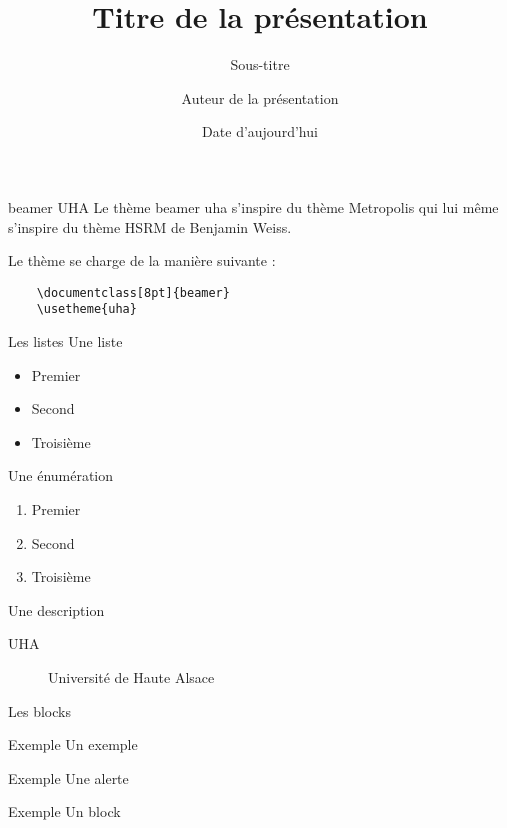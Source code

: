 \documentclass[9pt]{beamer}
\title{Titre de la présentation}
\subtitle{Sous-titre}
\date{Date d'aujourd'hui}
\author{Auteur de la présentation}
\institute{Université de Haute Alsace}
\begin{document}
\begin{frame}
	\titlepage
\end{frame}

\begin{frame}[fragile]{beamer UHA}
	Le thème beamer uha s'inspire du thème Metropolis qui lui même s'inspire du thème HSRM de Benjamin Weiss.

	Le thème se charge de la manière suivante :

	\begin{verbatim}
	\documentclass[8pt]{beamer}
	\usetheme{uha}
	\end{verbatim}
\end{frame}


\begin{frame}{Les listes}
	Une liste
	\begin{itemize}
		\item Premier
		\item Second
		\item Troisième
	\end{itemize}

	Une énumération
	\begin{enumerate}
		\item Premier
		\item Second
		\item Troisième
	\end{enumerate}

	Une description
	\begin{description}
		\item [UHA] Université de Haute Alsace
	\end{description}
\end{frame}

\begin{frame}{Les blocks}
	\begin{exampleblock}{Exemple}
		Un exemple
	\end{exampleblock}
	\begin{alertblock}{Exemple}
		Une alerte
	\end{alertblock}
	\begin{block}{Exemple}
		Un block
	\end{block}
\end{frame}
\end{document}
